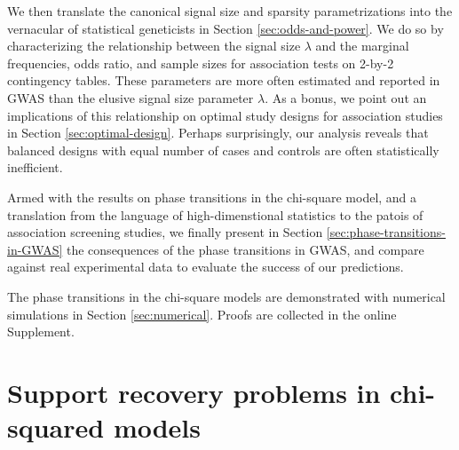 We then translate the canonical signal size and sparsity parametrizations into the vernacular of statistical geneticists in Section \ref{sec:odds-and-power}.
We do so by characterizing the relationship between the signal size $\lambda$ and the marginal frequencies, odds ratio, and sample sizes for association tests on 2-by-2 contingency tables. 
These parameters are more often estimated and reported in \ac{GWAS} than the elusive signal size parameter $\lambda$.
As a bonus, we point out an implications of this relationship on optimal study designs for association studies in Section \ref{sec:optimal-design}.
Perhaps surprisingly, our analysis reveals that balanced designs with equal number of cases and controls are often statistically inefficient.

Armed with the results on phase transitions in the chi-square model, and a translation from the language of high-dimenstional statistics to the patois of association screening studies, we finally present in Section \ref{sec:phase-transitions-in-GWAS} the consequences of the phase transitions in \ac{GWAS}, and compare against real experimental data to evaluate the success of our predictions.

The phase transitions in the chi-square models are demonstrated with numerical simulations in Section \ref{sec:numerical}.
Proofs are collected in the online Supplement.


\section{Support recovery problems in chi-squared models}
\label{sec:chisq-boundaries}



